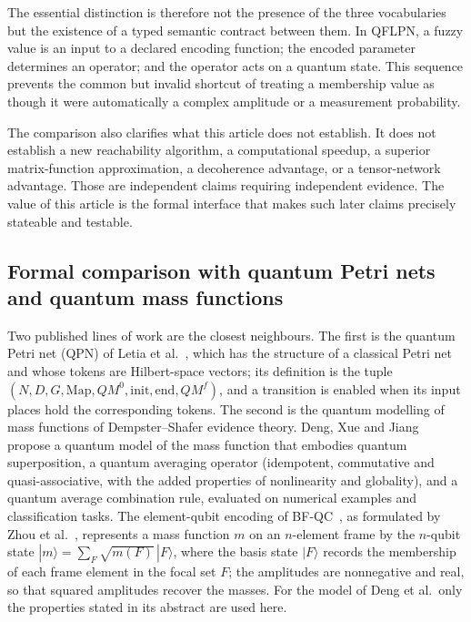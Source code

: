 \documentclass[final,3p,times]{elsarticle}
\begin{document}
The essential distinction is therefore not the presence of the three vocabularies but the existence of a typed semantic contract between them. In QFLPN, a fuzzy value is an input to a declared encoding function; the encoded parameter determines an operator; and the operator acts on a quantum state. This sequence prevents the common but invalid shortcut of treating a membership value as though it were automatically a complex amplitude or a measurement probability.

The comparison also clarifies what this article does not establish. It does not establish a new reachability algorithm, a computational speedup, a superior matrix-function approximation, a decoherence advantage, or a tensor-network advantage. Those are independent claims requiring independent evidence. The value of this article is the formal interface that makes such later claims precisely stateable and testable.

\subsection{Formal comparison with quantum Petri nets and quantum mass functions}\label{sec:neighbours}
Two published lines of work are the closest neighbours. The first is the quantum Petri net (QPN) of Letia et al.~\cite{ref4,ref5}, which has the structure of a classical Petri net and whose tokens are Hilbert-space vectors; its definition is the tuple $(N,D,G,\mathrm{Map},QM^0,\mathrm{init},\mathrm{end},QM^f)$, and a transition is enabled when its input places hold the corresponding tokens. The second is the quantum modelling of mass functions of Dempster--Shafer evidence theory. Deng, Xue and Jiang~\cite{refDeng2023} propose a quantum model of the mass function that embodies quantum superposition, a quantum averaging operator (idempotent, commutative and quasi-associative, with the added properties of nonlinearity and globality), and a quantum average combination rule, evaluated on numerical examples and classification tasks. The element-qubit encoding of BF-QC~\cite{refZhouBFQC}, as formulated by Zhou et al.~\cite{refZhouTBM}, represents a mass function $m$ on an $n$-element frame by the $n$-qubit state $|m\rangle=\sum_{F}\sqrt{m(F)}\,|F\rangle$, where the basis state $|F\rangle$ records the membership of each frame element in the focal set $F$; the amplitudes are nonnegative and real, so that squared amplitudes recover the masses. For the model of Deng et al.\ only the properties stated in its abstract are used here.
\end{document}
